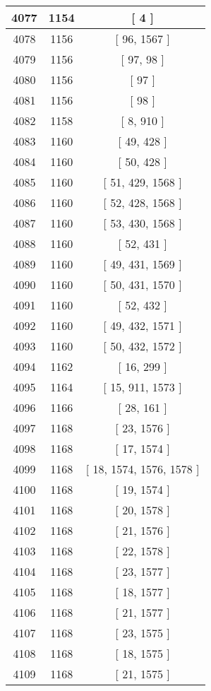 \begin{center}
\begin{longtable}[H]{|| c c c ||}
\hline
4077 & 1154 & [ 4 ] \\ 
\hline
4078 & 1156 & [ 96, 1567 ] \\ 
\hline
4079 & 1156 & [ 97, 98 ] \\ 
\hline
4080 & 1156 & [ 97 ] \\ 
\hline
4081 & 1156 & [ 98 ] \\ 
\hline
4082 & 1158 & [ 8, 910 ] \\ 
\hline
4083 & 1160 & [ 49, 428 ] \\ 
\hline
4084 & 1160 & [ 50, 428 ] \\ 
\hline
4085 & 1160 & [ 51, 429, 1568 ] \\ 
\hline
4086 & 1160 & [ 52, 428, 1568 ] \\ 
\hline
4087 & 1160 & [ 53, 430, 1568 ] \\ 
\hline
4088 & 1160 & [ 52, 431 ] \\ 
\hline
4089 & 1160 & [ 49, 431, 1569 ] \\ 
\hline
4090 & 1160 & [ 50, 431, 1570 ] \\ 
\hline
4091 & 1160 & [ 52, 432 ] \\ 
\hline
4092 & 1160 & [ 49, 432, 1571 ] \\ 
\hline
4093 & 1160 & [ 50, 432, 1572 ] \\ 
\hline
4094 & 1162 & [ 16, 299 ] \\ 
\hline
4095 & 1164 & [ 15, 911, 1573 ] \\ 
\hline
4096 & 1166 & [ 28, 161 ] \\ 
\hline
4097 & 1168 & [ 23, 1576 ] \\ 
\hline
4098 & 1168 & [ 17, 1574 ] \\ 
\hline
4099 & 1168 & [ 18, 1574, 1576, 1578 ] \\ 
\hline
4100 & 1168 & [ 19, 1574 ] \\ 
\hline
4101 & 1168 & [ 20, 1578 ] \\ 
\hline
4102 & 1168 & [ 21, 1576 ] \\ 
\hline
4103 & 1168 & [ 22, 1578 ] \\ 
\hline
4104 & 1168 & [ 23, 1577 ] \\ 
\hline
4105 & 1168 & [ 18, 1577 ] \\ 
\hline
4106 & 1168 & [ 21, 1577 ] \\ 
\hline
4107 & 1168 & [ 23, 1575 ] \\ 
\hline
4108 & 1168 & [ 18, 1575 ] \\ 
\hline
4109 & 1168 & [ 21, 1575 ] \\ 
\hline

\end{longtable}
\end{center}
